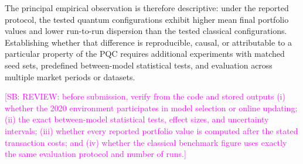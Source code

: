 \documentclass[aps,floatfix,superscriptaddress,twocolumn,tightenlines,amsmath,amssymb,nofootinbib,10pt,longbibliography,prl]{revtex4-2}
\newcommand{\sam}[1]{\textcolor{magenta}{[SB: {#1}]}}
\begin{document}
The principal empirical observation is therefore descriptive: under the reported protocol, the tested quantum configurations exhibit higher mean final portfolio values and lower run-to-run dispersion than the tested classical configurations. Establishing whether that difference is reproducible, causal, or attributable to a particular property of the PQC requires additional experiments with matched seed sets, predefined between-model statistical tests, and evaluation across multiple market periods or datasets.

\sam{REVIEW: before submission, verify from the code and stored outputs (i) whether the 2020 environment participates in model selection or online updating; (ii) the exact between-model statistical tests, effect sizes, and uncertainty intervals; (iii) whether every reported portfolio value is computed after the stated transaction costs; and (iv) whether the classical benchmark figure uses exactly the same evaluation protocol and number of runs.}


\end{document}
